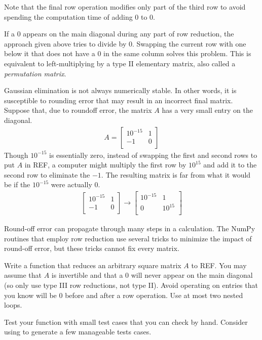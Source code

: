 Note that the final row operation modifies only part of the third row to avoid spending the computation time of adding $0$ to $0$.

If a $0$ appears on the main diagonal during any part of row reduction, the approach given above tries to divide by $0$.
Swapping the current row with one below it that does not have a $0$ in the same column solves this problem.
This is equivalent to left-multiplying by a type II elementary matrix, also called a \emph{permutation matrix}.

\begin{warn} %
Gaussian elimination is not always numerically stable.
In other words, it is susceptible to rounding error that may result in an incorrect final matrix.
Suppose that, due to roundoff error, the matrix $A$ has a very small entry on the diagonal.
\begin{align*}
A = \left[\begin{array}{cc}
10^{-15} & 1 \\
-1 & 0 \\
\end{array}\right]
\end{align*}
Though $10^{-15}$ is essentially zero, instead of swapping the first and second rows to put $A$ in REF, a computer might multiply the first row by $10^{15}$ and add it to the second row to eliminate the $-1$.
The resulting matrix is far from what it would be if the $10^{-15}$ were actually $0$.
\begin{align*}
\left[\begin{array}{cc}
10^{-15} & 1 \\
-1 & 0 \\
\end{array}\right]
\longrightarrow
\left[\begin{array}{cc}
10^{-15} & 1 \\
0 & 10^{15} \\
\end{array}\right]
\end{align*}

Round-off error can propagate through many steps in a calculation. %
The NumPy routines that employ row reduction use several tricks to minimize the impact of round-off error, but these tricks cannot fix every matrix.
\end{warn}

\begin{problem} %
Write a function that reduces an arbitrary square matrix $A$ to REF.
You may assume that $A$ is invertible and that a $0$ will never appear on the main diagonal (so only use type III row reductions, not type II).
Avoid operating on entries that you know will be $0$ before and after a row operation.
Use at most two nested loops.

Test your function with small test cases that you can check by hand.
Consider using  to generate a few manageable tests cases.
\label{prob:ref-row-reduction}
\end{problem}

